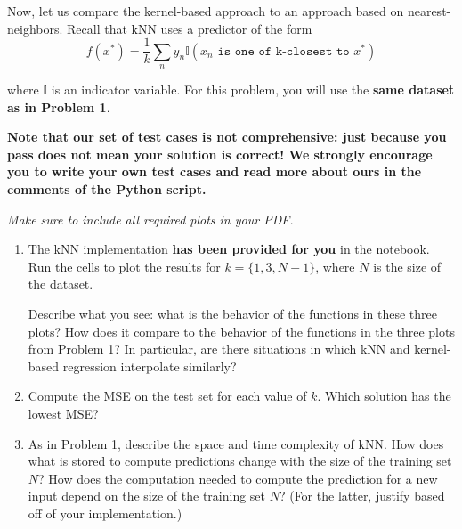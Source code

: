 \documentclass[submit]{harvardml}
\begin{document}
\begin{problem}

Now, let us compare the kernel-based approach to an approach based on
nearest-neighbors.  Recall that kNN uses a predictor of the form
  \begin{equation*}
    f(x^*) = \frac{1}{k} \sum_n y_n \mathbb{I}(x_n \texttt{ is one of k-closest to } x^*)
  \end{equation*}

\noindent where $\mathbb{I}$ is an indicator variable. For this problem, you will use the \textbf{same dataset as in Problem 1}.



\textbf{Note that our set of test cases is not comprehensive: just because you pass does not mean your solution is correct! We strongly encourage you to write your own test cases and read more about ours in the comments of the Python script.}

\vspace{0.5cm}
\noindent\emph{Make sure to include all required plots in your PDF.}


\begin{enumerate}

\item The kNN implementation \textbf{has been provided for you} in the notebook. Run the cells to plot the results for $k=\{1, 3, N-1\}$, where $N$ is the size of the dataset.

  Describe what you see: what is the behavior of the functions in
  these three plots?  How does it compare to the behavior of the
  functions in the three plots from Problem 1? In particular, are
  there situations in which kNN and kernel-based regression
  interpolate similarly?

\item Compute the MSE on the test set for each value of $k$.  Which solution has the lowest MSE?  

\item As in Problem 1, describe the space and time complexity of kNN.  How does what is stored to compute predictions change with the size of the training set $N$?  How does the computation needed to compute the prediction for a new input depend on the size of the training set $N$? (For the latter, justify based off of your implementation.)

\end{enumerate}

\end{problem}
\end{document}
